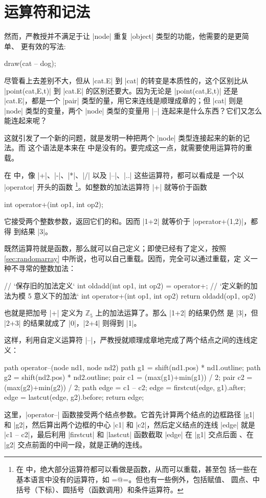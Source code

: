 \section{运算符和记法}
\label{sec:operator}

然而，严教授并不满足于让 |node| 重复 |object| 类型的功能，他需要的是更简单、
更有效的写法:
\begin{asycode}
draw(cat -- dog);
\end{asycode}
尽管看上去差别不大，但从 |cat.E| 到 |cat| 的转变是本质性的，这个区别比从
|point(cat,E,t)| 到 |cat.E| 的区别还要大。因为无论是 |point(cat,E,t)| 还是
|cat.E|，都是一个 |pair| 类型的量，用它来连线是顺理成章的；但 |cat| 则是
|node| 类型的变量，两个 |node| 类型的变量用 |--| 连起来是什么东西？它们又怎么
能连起来呢？

这就引发了一个新的问题，就是发明一种把两个 |node| 类型连接起来的新的记法。而
这个语法是本来在 \Asy{} 中是没有的。要完成这一点，就需要使用运算符的重载。

在 \Asy{} 中，像 |+|、|-|、|*|、|/| 以及 |--|、|..| 这些运算符，都可以看成是
一个以 |operator| 开头的函数
\footnote{在 \Asy{} 中，绝大部分运算符都可以看做是函数，从而可以重载，甚至包
括一些在基本语言中没有的运算符，如 \asyinline=@=。但也有一些例外，包括赋值、
圆点、中括号（下标）、圆括号（函数调用）和条件运算符。}。如整数的加法运算符
|+| 就等价于函数
\begin{asycode}
int operator+(int op1, int op2);
\end{asycode}
它接受两个整数参数，返回它们的和。因而 |1+2| 就等价于 |operator+(1,2)|，都得
到结果 |3|。

既然运算符就是函数，那么就可以自己定义；即使已经有了定义，按照
\autoref{sec:randomarray} 中所说，也可以自己重载。因而，完全可以通过重载，定
义一种不寻常的整数加法：
\begin{asycode}
// `\color{comment}保存旧的加法定义`
int oldadd(int op1, int op2) = operator+;
// `\color{comment}定义新的加法为模 5 意义下的加法`
int operator+(int op1, int op2)
{
    return oldadd(op1, op2) %
}
\end{asycode}
也就是把加号 |+| 定义为 $\mathbb{Z}_5$ 上的加法运算了。那么 |1+2| 的结果仍然
是 |3|，但 |2+3| 的结果就成了 |0|，|2+4| 则得到 |1|。

这样，利用自定义运算符 |--|，严教授就顺理成章地完成了两个结点之间的连线定义：
\begin{asycode}
path operator--(node nd1, node nd2)
{
    path g1 = shift(nd1.pos) * nd1.outline;
    path g2 = shift(nd2.pos) * nd2.outline;
    pair c1 = (max(g1)+min(g1)) / 2;
    pair c2 = (max(g2)+min(g2)) / 2;
    path edge = c1 -- c2;
    edge = firstcut(edge, g1).after;
    edge = lastcut(edge, g2).before;
    return edge;
}
\end{asycode}
这里，|operator--| 函数接受两个结点参数。它首先计算两个结点的边框路径 |g1| 和
|g2|，然后算出两个边框的中心 |c1| 和 |c2|，然后定义结点的连线 |edge| 就是
|c1 -- c2|，最后利用 |firstcut| 和 |lastcut| 函数截取 |edge| 在 |g1| 交点后面
、在 |g2| 交点前面的中间一段，就是正确的连线。


